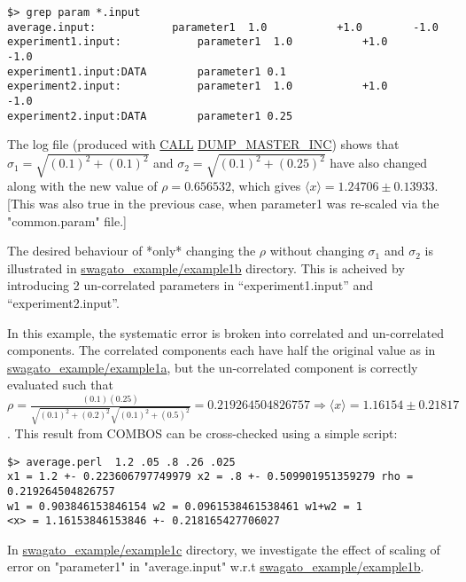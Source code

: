 \documentclass[12pt,a4paper,dvips]{article}
\begin{document}
\vspace*{-.5cm}
\begin{verbatim}
$> grep param *.input 
average.input:            parameter1  1.0           +1.0        -1.0
experiment1.input:            parameter1  1.0           +1.0        -1.0
experiment1.input:DATA        parameter1 0.1
experiment2.input:            parameter1  1.0           +1.0        -1.0
experiment2.input:DATA        parameter1 0.25
\end{verbatim}

\vspace*{-.5cm}
The log file (produced with \url{CALL} \url{DUMP_MASTER_INC}) shows that $\sigma_1 = \sqrt{(0.1)^2+(0.1)^2}$
and $\sigma_2 = \sqrt{(0.1)^2+(0.25)^2}$ have also changed along with the new value of $\rho = 0.656532$,
which gives $\langle x \rangle = 1.24706 \pm 0.13933$. [This was also true in the previous case,
when parameter1 was re-scaled via the "common.param" file.]


The desired behaviour of *only* changing the $\rho$ without changing $\sigma_1$ and $\sigma_2$ is illustrated
in \url{swagato_example/example1b} directory. 
This is acheived by introducing 2 un-correlated parameters in ``experiment1.input'' and ``experiment2.input''.

In this example, the systematic error is broken into correlated and un-correlated components.
The correlated components each have half the original value as in \url{swagato_example/example1a}, 
but the un-correlated component is correctly evaluated
such that $\rho = \frac{(0.1)(0.25)}{\sqrt{(0.1)^2+(0.2)^2}\sqrt{(0.1)^2+(0.5)^2}} = 0.219264504826757 \Rightarrow
\langle x \rangle = 1.16154 \pm 0.21817$. This result from COMBOS can be cross-checked using a simple script:

\vspace*{-.5cm}
\begin{verbatim}
$> average.perl  1.2 .05 .8 .26 .025
x1 = 1.2 +- 0.223606797749979 x2 = .8 +- 0.509901951359279 rho = 0.219264504826757
w1 = 0.903846153846154 w2 = 0.0961538461538461 w1+w2 = 1
<x> = 1.16153846153846 +- 0.218165427706027
\end{verbatim}

\vspace*{-.5cm}
In \url{swagato_example/example1c} directory,
we investigate the effect of scaling of error on "parameter1" in "average.input" w.r.t \url{swagato_example/example1b}.
\end{document}
